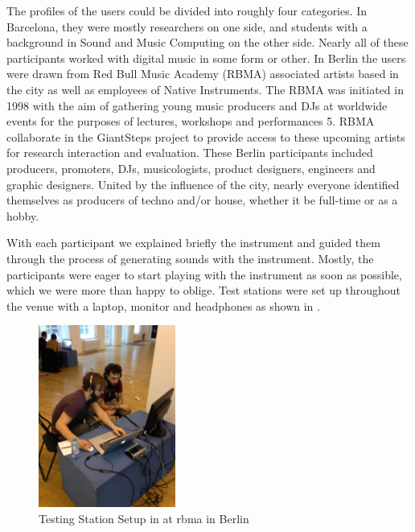 The profiles of the users could be divided into roughly four categories. In Barcelona, they were mostly researchers on one side, and students with a background in Sound and Music Computing on the other side. Nearly all of these participants worked with digital music in some form or other. In Berlin the users were drawn from Red Bull Music Academy (RBMA) associated artists based in the city as well as employees of Native Instruments. The RBMA was initiated in 1998 with the aim of gathering young music producers and DJs at worldwide events for the purposes of lectures, workshops and performances 5. RBMA collaborate in the GiantSteps project \citep{Knees2015} to provide access to these upcoming artists for research interaction and evaluation. These Berlin participants included producers, promoters, DJs, musicologists, product designers, engineers and graphic designers. United by the influence of the city, nearly everyone identified themselves as producers of techno and/or house, whether it be full-time or as a hobby.

With each participant we explained briefly the instrument and guided them through the process of generating sounds with the instrument. Mostly, the participants were eager to start playing with the instrument as soon as possible, which we were more than happy to oblige. Test stations were set up throughout the venue with a laptop, monitor and headphones as shown in .

\begin{figure}
	\begin{center}
		\includegraphics[width=0.4\textwidth]{ch07_evaluation/figures/berlin.jpg}
	\end{center}
	\caption[Testing Station Setup at Red Bull Music Academy in Berlin]{Testing Station Setup in at \acrshort{rbma} in Berlin}
	\label{fig:berlin}
\end{figure}


